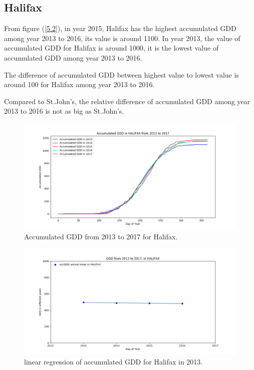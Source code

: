 \documentclass[12pt]{article}
\begin{document}
\subsection{Halifax}

From figure (\ref{5.2}), in year 2015, Halifax has the highest accumulated GDD among year 2013 to 2016, its value is around 1100. In year 2013, the value of accumulated GDD for Halifax is around 1000, it is the lowest value of accumulated GDD among year 2013 to 2016. 

The difference of accumulated GDD between highest value to lowest value is around 100 for Halifax among year 2013 to 2016.

Compared to St.John's, the relative difference of accumulated GDD among year 2013 to 2016 is not as big as St.John's.
\begin{center}
\begin{figure}[H]
\includegraphics[width=5.25in]{../Plot/HALIFAX/accGDD_2013_2017.png}
\caption{Accumulated GDD from 2013 to 2017 for Halifax.}
\label{11}
\end{figure}
\end{center}

\begin{center}
\begin{figure}[H]
\includegraphics[width=5.25in]{../Plot/HALIFAX/GDD_LinearRegression_HALIFAX.png}

\caption{linear regression of accumulated GDD for  Halifax in 2013.}
\label{12}
\end{figure}
\end{center}
\end{document}
